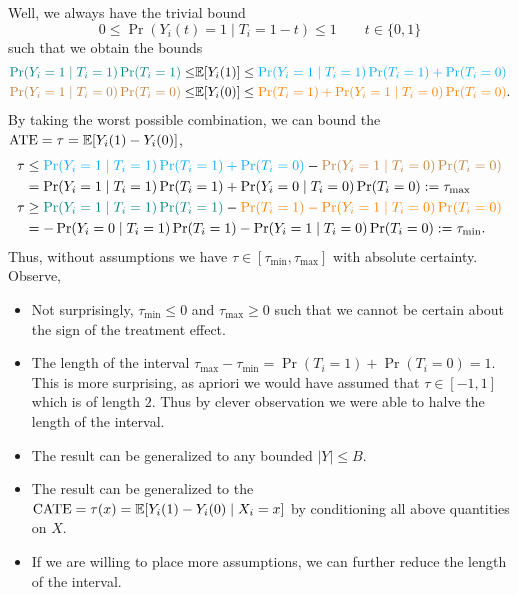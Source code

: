 \documentclass[11pt]{exam}
\begin{document}
Well, we always have the trivial bound
\begin{equation}\label{eq:ate_trivial}
    0 \leq \Pr(Y_i(t) = 1 \mid T_i = 1-t) \leq 1 \qquad t \in \{0, 1\}
\end{equation}
such that we obtain the bounds
\begin{align*}
    \textcolor{teal}{\Pr(Y_i = 1 \mid T_i = 1) \Pr(T_i = 1)} \leq & \mathbb{E}[Y_i(1)] \leq \textcolor{cyan}{\Pr(Y_i = 1 \mid T_i = 1) \Pr(T_i = 1) + \Pr(T_i = 0)}
    \\
    \textcolor{brown}{\Pr(Y_i = 1 \mid T_i = 0) \Pr(T_i = 0)} \leq & \mathbb{E}[Y_i(0)] \leq \textcolor{orange}{\Pr(T_i = 1) + \Pr(Y_i = 1 \mid T_i = 0) \Pr(T_i = 0)}.
\end{align*}
By taking the worst possible combination, we can bound the $\mathrm{ATE} = \tau = \mathbb{E}[Y_i(1) - Y_i(0)]$,
\begin{align*}
    \tau &\leq  \textcolor{cyan}{\Pr(Y_i = 1 \mid T_i = 1) \Pr(T_i = 1) + \Pr(T_i = 0)} - \textcolor{brown}{\Pr(Y_i = 1 \mid T_i = 0) \Pr(T_i = 0)}
    \\
    &= \Pr(Y_i = 1 \mid T_i = 1) \Pr(T_i = 1) + \Pr(Y_i = 0 \mid T_i = 0) \Pr(T_i = 0) := \tau_{\max}
    \\
    \tau &\geq \textcolor{teal}{\Pr(Y_i = 1 \mid T_i = 1) \Pr(T_i = 1)} - \textcolor{orange}{\Pr(T_i = 1) - \Pr(Y_i = 1 \mid T_i = 0) \Pr(T_i = 0)}
    \\
    &= -\Pr(Y_i = 0 \mid T_i = 1)\Pr(T_i = 1) -\Pr(Y_i = 1 \mid T_i = 0) \Pr(T_i = 0) := \tau_{\min}.
\end{align*}
Thus, without assumptions we have $\tau \in [\tau_{\min}, \tau_{\max}]$ with absolute certainty. Observe,
\begin{itemize}
    \item Not surprisingly, $\tau_{\min} \leq 0$ and $\tau_{\max} \geq 0$ such that we cannot be certain about the sign of the treatment effect.
    \item The length of the interval $\tau_{\max} - \tau_{\min} = \Pr(T_i = 1) + \Pr(T_i = 0) = 1$. This is more surprising, as apriori we would have assumed that $\tau \in [-1, 1]$ which is of length $2$. Thus by clever observation we were able to halve the length of the interval.
    \item The result can be generalized to any bounded $|Y| \leq B$.
    \item The result can be generalized to the $\mathrm{CATE} = \tau(x) = \mathbb{E}[Y_i(1) - Y_i(0) \mid X_i = x]$ by conditioning all above quantities on $X$.
    \item If we are willing to place more assumptions, we can further reduce the length of the interval.
\end{itemize}
\end{document}
